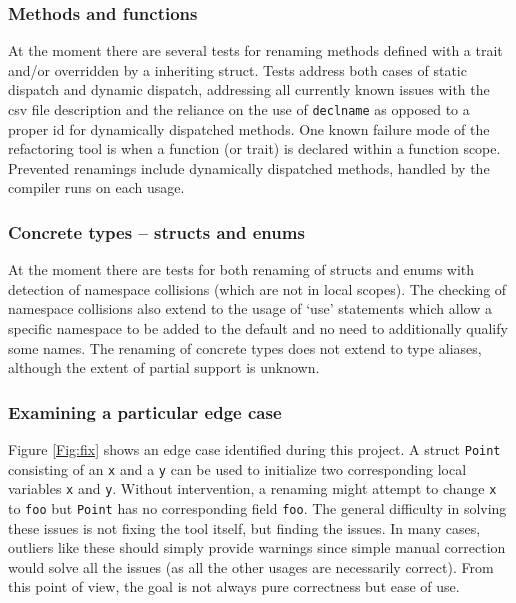 
\subsubsection{Methods and functions}
At the moment there are several tests for renaming methods defined with a trait and/or overridden by a inheriting struct. Tests address both cases of static dispatch and dynamic dispatch, addressing all currently known issues with the csv file description and the reliance on the use of {\verb|declname|} as opposed to a proper id for dynamically dispatched methods. One known failure mode of the refactoring tool is when a function (or trait) is declared within a function scope. Prevented renamings include dynamically dispatched methods, handled by the compiler runs on each usage.

\subsubsection{Concrete types -- structs and enums}
At the moment there are tests for both renaming of structs and enums with detection of namespace collisions (which are not in local scopes). The checking of namespace collisions also extend to the usage of `use' statements which allow a specific namespace to be added to the default and no need to additionally qualify some names. The renaming of concrete types does not extend to type aliases, although the extent of partial support is unknown.

\subsubsection{Examining a particular edge case}
Figure \ref{Fig:fix} shows an edge case identified during this project. A struct {\verb|Point|} consisting of an {\verb|x|} and a {\verb|y|} can be used to initialize two corresponding local variables {\verb|x|} and {\verb|y|}. Without intervention, a renaming might attempt to change {\verb|x|} to  {\verb|foo|} but {\verb|Point|} has no corresponding field {\verb|foo|}. The general difficulty in solving these issues is not fixing the tool itself, but finding the issues. In many cases, outliers like these should simply provide warnings since simple manual correction would solve all the issues (as all the other usages are necessarily correct). From this point of view, the goal is not always pure correctness but ease of use.

